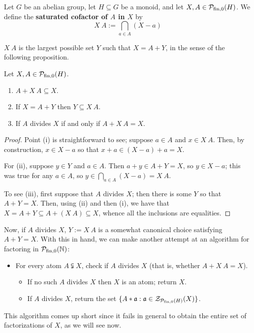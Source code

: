 \begin{defn} \label{def:cofactor}
	Let $G$ be an abelian group, let $H \subseteq G$ be a monoid, and let $X,A\in \mathcal{P}_{\textrm{fin},0}(H)$.
	We define the \textbf{saturated cofactor of $A$ in $X$} by
	\[ X\:A := \bigcap_{a\in A} (X-a) \]
\end{defn}

$X\:A$ is the largest possible set $Y$ such that $X = A + Y$, in the sense of the following proposition.

\begin{prop} \label{prop:cofactors}
	Let $X,A \in \mathcal{P}_{\textrm{fin}, 0}(H)$. 
	\begin{enumerate}[label={\rm (\roman{*})}]
		\item $A + X\:A \subseteq X$.
		\item If $X = A + Y$ then $Y \subseteq X\:A$.
		\item If $A$ divides $X$ if and only if $A + X\:A = X$.
	\end{enumerate}
\end{prop}

\begin{proof}
	Point (i) is straightforward to see; suppose $a\in A$ and $x\in X\:A$.
	Then, by construction, $x\in X-a$ so that $x+a \in (X-a) +a = X$.
	
	For (ii), suppose $y\in Y$ and $a\in A$.
	Then $a+y \in A + Y = X$, so $y \in X-a$; this was true for any $a\in A$, so $y\in \bigcap_{a\in A} (X-a) = X\:A$.
	
	To see (iii), first suppose that $A$ divides $X$; then there is some $Y$ so that $A + Y = X$.
	Then, using (ii) and then (i), we have that $X = A+Y \subseteq A+ (X\:A) \subseteq X$, whence all the inclusions are equalities.
\end{proof}

Now, if $A$ divides $X$, $Y := X\:A$ is a somewhat canonical choice satisfying $A + Y = X$.
With this in hand, we can make another attempt at an algorithm for factoring in ${\mathcal{P}_{\textrm{fin},0}(\mathbb{N})}$:

\begin{itemize}
	\item For every atom $A \subsetneqq X$, check if $A$ divides $X$ (that is, whether $A + X\:A = X$).
	\begin{itemize}
		\item If no such $A$ divides $X$ then $X$ is an atom; return $X$.
		\item If $A$ divides $X$, return the set $\{A * \mathfrak{a}: \mathfrak{a}\in \mathcal{Z}_{\mathcal{P}_{\textrm{fin}, 0}(H)}(X) \}$.
	\end{itemize}
\end{itemize}
This algorithm comes up short since it fails in general to obtain the entire set of factorizations of $X$, as we will see now.

